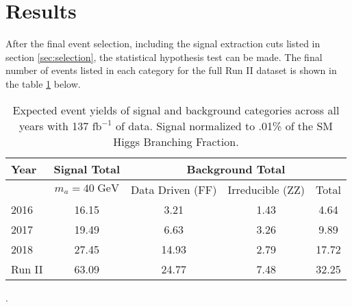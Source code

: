 
\section{Results}
\label{sec:res}
After the final event selection, including the signal extraction cuts listed in section \ref{sec:selection}, the statistical hypothesis test can be made. 
The final number of events listed in each category for the full Run II dataset is shown in the table \ref{tab:event_yield} below.


\begin{table}[h!tbp]
\label{tab:event_yield}
\centering
\begin{tabular}{l||c|c|c||c}
\hline
Year            &  Signal Total             & \multicolumn{3}{c}{Background Total} \\\hline
                & $m_a=40\;\text{GeV}$ & Data Driven (FF)  & Irreducible (ZZ)                 & Total\\\hline
2016                      & 16.15                       & 3.21             & 1.43                   & 4.64\\\hline
2017                      & 19.49                       & 6.63             & 3.26                   & 9.89\\\hline
2018                      & 27.45                       & 14.93             & 2.79                  & 17.72\\\hline\hline
Run II                      & 63.09                       & 24.77             & 7.48                & 32.25\\\hline
\end{tabular}
\caption{Expected event yields of signal and background categories across all years with 137 $\text{fb}^{-1}$ of data. Signal normalized to .01\% of the SM Higgs Branching Fraction.
}
\end{table}.
 



